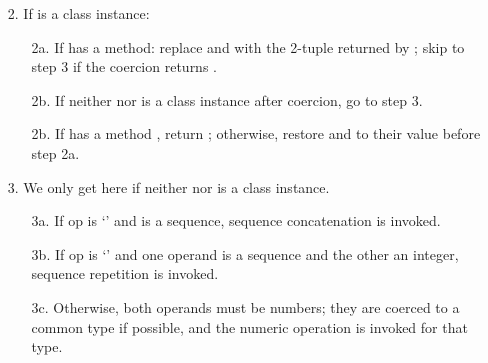 \begin{description}
\begin{itemize}
\begin{itemize}
	\end{itemize}

\item[2.] If  is a class instance:

	\begin{itemize}

	\item[2a.] If  has a  method:
	replace  and  with the 2-tuple returned by
	; skip to step 3 if the
	coercion returns .

	\item[2b.] If neither  nor  is a class instance
	after coercion, go to step 3.

	\item[2b.] If  has a method , return
	; otherwise, restore 
	and  to their value before step 2a.

	\end{itemize}

\item[3.] We only get here if neither  nor  is a class
instance.

	\begin{itemize}

	\item[3a.] If op is `\code{+}' and  is a sequence,
	sequence concatenation is invoked.

	\item[3b.] If op is `\code{*}' and one operand is a sequence
	and the other an integer, sequence repetition is invoked.

	\item[3c.] Otherwise, both operands must be numbers; they are
	coerced to a common type if possible, and the numeric
	operation is invoked for that type.

	\end{itemize}

\end{itemize}

\end{description}
